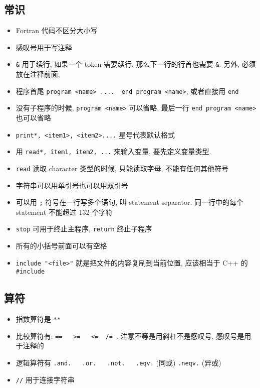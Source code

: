 
\subsection{常识}
\begin{itemize}
\item Fortran 代码不区分大小写
\item 感叹号用于写注释
\item \verb`&` 用于续行, 如果一个 token 需要续行, 那么下一行的行首也需要 \verb`&`. 另外, 必须放在注释前面.
\item 程序首尾  \verb`program <name> ....  end program <name>`, 或者直接用 \verb`end`
\item 没有子程序的时候, \verb`program <name>` 可以省略, 最后一行 \verb`end program <name>` 也可以省略
\item \verb`print*, <item1>, <item2>....` 星号代表默认格式
\item 用 \verb`read*, item1, item2, ...` 来输入变量, 要先定义变量类型. 
\item \verb`read` 读取 character 类型的时候, 只能读取字母, 不能有任何其他符号
\item 字符串可以用单引号也可以用双引号
\item 可以用 \verb`;` 符号在一行写多个语句, 叫 statement separator. 同一行中的每个 statement 不能超过 132 个字符
\item \verb`stop` 可用于终止主程序, \verb`return` 终止子程序
\item 所有的小括号前面可以有空格
\item \verb`include "<file>"` 就是把文件的内容复制到当前位置, 应该相当于 C++ 的 \verb|#include|
\end{itemize}

\subsection{算符}
\begin{itemize}
\item 指数算符是 \verb`**`
\item 比较算符有: \verb`==   >=   <=  /= `.  注意不等是用斜杠不是感叹号. 感叹号是用于注释的
\item 逻辑算符有 \verb`.and.   .or.   .not.   .eqv.` (同或)  \verb`.neqv.` (异或)
\item \verb`//` 用于连接字符串
\end{itemize}

